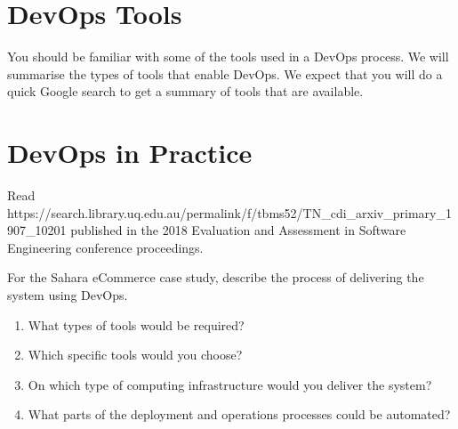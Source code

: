 \documentclass{csse4400}
\begin{document}
\section{DevOps Tools}
You should be familiar with some of the tools used in a DevOps process.
We will summarise the types of tools that enable DevOps.
We expect that you will do a quick Google search to get a summary of tools that are available.


\section{DevOps in Practice}
Read 
{https://search.library.uq.edu.au/permalink/f/tbms52/TN_cdi_arxiv_primary_1907_10201}
published in the 2018 Evaluation and Assessment in Software Engineering conference proceedings.

For the Sahara eCommerce case study, describe the process of delivering the system using DevOps.
\begin{enumerate}
    \item What types of tools would be required?
    \item Which specific tools would you choose?
    \item On which type of computing infrastructure would you deliver the system?
    \item What parts of the deployment and operations processes could be automated?
\end{enumerate}




\end{document}
